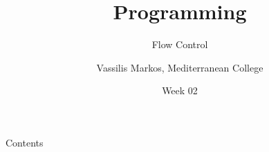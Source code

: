 \documentclass[aspectratio=169, 12pt, xcolor=table]{beamer}
\title{Programming}
\subtitle{Flow Control}
\date{Week 02}
\author{Vassilis Markos, Mediterranean College}
\newcommand{\ohref}[1]{\href{#1}{\texttt{#1}}}
\begin{document}
	\begin{frame}
		\titlepage
	\end{frame}

	\begin{frame}{Contents}
		\tableofcontents
	\end{frame}

%	
%	
%
\end{document}
